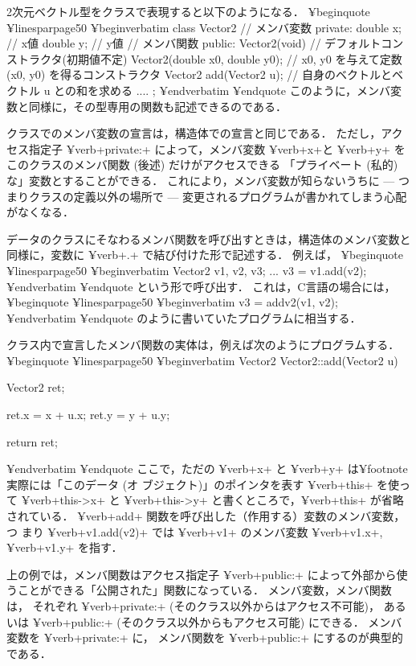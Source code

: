 {{{{{2次元ベクトル型をクラスで表現すると以下のようになる．
¥begin{quote}
¥linesparpage{50}
¥begin{verbatim}
class Vector2 {
// メンバ変数
private:
        double x;       // x値
        double y;       // y値
// メンバ関数
public:
        Vector2(void)   { }
                // デフォルトコンストラクタ(初期値不定)
        Vector2(double x0, double y0);
                // x0, y0 を与えて定数 (x0, y0) を得るコンストラクタ
        Vector2 add(Vector2 u);
                // 自身のベクトルとベクトル u との和を求める
        ....
};
¥end{verbatim}
¥end{quote}
このように，メンバ変数と同様に，その型専用の関数も記述できるのである．

クラスでのメンバ変数の宣言は，構造体での宣言と同じである．
ただし，アクセス指定子 ¥verb+private:+ によって，メンバ変数 ¥verb+x+と
¥verb+y+ をこのクラスのメンバ関数 (後述) だけがアクセスできる
「プライベート (私的) な」変数とすることができる．
これにより，メンバ変数が知らないうちに --- 
つまりクラスの定義以外の場所で --- 変更されるプログラムが書かれてしまう心配がなくなる．

データのクラスにそなわるメンバ関数を呼び出すときは，構造体のメンバ変数と同様に，変数に ¥verb+.+ で結び付けた形で記述する．
例えば，
¥begin{quote}
¥linesparpage{50}
¥begin{verbatim}
Vector2 v1, v2, v3;
...
v3 = v1.add(v2);
¥end{verbatim}
¥end{quote}
という形で呼び出す．
これは，C言語の場合には，
¥begin{quote}
¥linesparpage{50}
¥begin{verbatim}
v3 = addv2(v1, v2);
¥end{verbatim}
¥end{quote}
のように書いていたプログラムに相当する．

クラス内で宣言したメンバ関数の実体は，例えば次のようにプログラムする．
¥begin{quote}
¥linesparpage{50}
¥begin{verbatim}
Vector2 Vector2::add(Vector2 u)
{
        Vector2 ret;

        ret.x = x + u.x;
        ret.y = y + u.y;

        return ret;
}
¥end{verbatim}
¥end{quote}
ここで，ただの ¥verb+x+ と ¥verb+y+ は¥footnote{実際には「このデータ (オ
 ブジェクト)」のポインタを表す ¥verb+this+ を使って ¥verb+this->x+ と ¥verb+this->y+
 と書くところで，¥verb+this+ が省略されている．}
 ¥verb+add+ 関数を呼び出した（作用する）変数のメンバ変数，つ
まり ¥verb+v1.add(v2)+ では ¥verb+v1+ のメンバ変数 ¥verb+v1.x+,
¥verb+v1.y+ を指す．

上の例では，メンバ関数はアクセス指定子 ¥verb+public:+ によって外部から使
うことができる「公開された」関数になっている．
メンバ変数，メンバ関数は，
それぞれ ¥verb+private:+ (そのクラス以外からはアクセス不可能)，
あるいは ¥verb+public:+ (そのクラス以外からもアクセス可能) にできる．
メンバ変数を ¥verb+private:+ に，
メンバ関数を ¥verb+public:+ にするのが典型的である．


}}}}}
